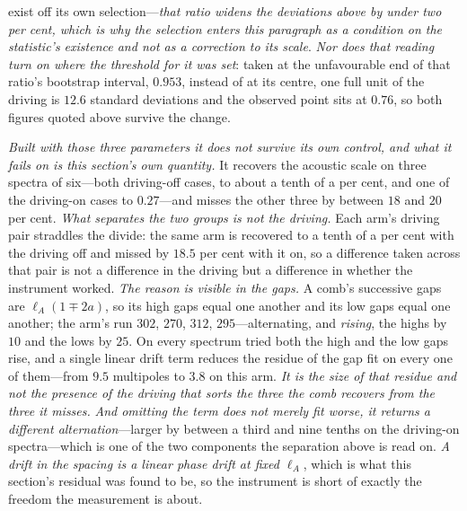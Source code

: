 \documentclass[11pt,a4paper]{article}
\theoremstyle{plain}
\theoremstyle{definition}
\theoremstyle{remark}
\begin{document}
exist off its own selection---\emph{that ratio widens the deviations above by under two per cent,
which is why the selection enters this paragraph as a condition on the statistic's existence and not
as a correction to its scale}. \emph{Nor does that reading turn on where the threshold for it was
set}: taken at the unfavourable end of that ratio's bootstrap interval, $0.953$, instead of at its centre, one full unit of the
driving is $12.6$ standard deviations and the observed point sits at $0.76$, so both figures quoted
above survive the change.

\emph{Built with those three parameters it does not survive its own control, and what it fails on is
this section's own quantity.} It recovers the acoustic scale on three spectra of six---both
driving-off cases, to about a tenth of a per cent, and one of the driving-on cases to $0.27$---and
misses the other three by between $18$ and $20$ per cent. \emph{What separates the two groups is not
the driving.} Each arm's driving pair straddles the divide: the same arm is recovered to a tenth of a
per cent with the driving off and missed by $18.5$ per cent with it on, so a difference taken across
that pair is not a difference in the driving but a difference in whether the instrument worked.
\emph{The reason is visible in the gaps.} A comb's successive gaps are $\ell_{A}(1\mp2a)$, so its
high gaps equal one another and its low gaps equal one another; the arm's run $302$, $270$, $312$,
$295$---alternating, and \emph{rising}, the highs by $10$ and the lows by $25$. On every spectrum
tried both the high and the low gaps rise, and a single linear drift term reduces the residue of the
gap fit on every one of them---from $9.5$ multipoles to $3.8$ on this arm. \emph{It is the size of
that residue and not the presence of the driving that sorts the three the comb recovers from the
three it misses.} \emph{And omitting the term does not merely fit worse, it returns a different
alternation}---larger by between a third and nine tenths on the driving-on spectra---which is one of
the two components the separation above is read on. \emph{A drift in the spacing is a linear phase
drift at fixed $\ell_{A}$}, which is what this section's residual was found to be, so the instrument
is short of exactly the freedom the measurement is about.
\end{document}

